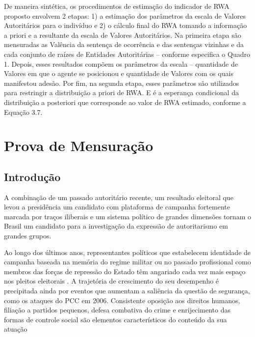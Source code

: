 \documentclass[
12pt,				%
openright,			%
twoside,			%
a4paper,			%
english,			%
french,				%
spanish,			%
brazil				%
]{abntex2}
\begin{document}
De maneira sintética, os procedimentos de estimação do indicador de RWA proposto envolvem 2 etapas: 1) a estimação dos parâmetros da escala de Valores Autoritários para o indivíduo e 2) o cálculo final do RWA tomando a informação a priori e a resultante da escala de Valores Autoritários. Na primeira etapa são mensuradas as Valência da sentença de ocorrência e das sentenças vizinhas e da cada conjunto de raízes de Entidades Autoritárias -- conforme especifica o Quadro 1. Depois, esses resultados compõem os parâmetros da escala -- quantidade de Valores em que o agente se posicionou e quantidade de Valores com os quais manifestou adesão. Por fim, na segunda etapa, esses parâmetros são utilizados para restringir a distribuição a priori de RWA. E é a esperança condicional da distribuição a posteriori que corresponde ao valor de RWA estimado, conforme a Equação 3.7.

\chapter{Prova de Mensuração}\label{resultados}

\section{Introdução}

A combinação de um passado autoritário recente, um resultado eleitoral que levou a presidência um candidato com plataforma de campanha fortemente marcada por traços iliberais \cite{hunter2019bolsonaro} e um sistema político de grandes dimensões tornam o Brasil um candidato para a investigação da expressão de autoritarismo em grandes grupos.

Ao longo dos últimos anos, representantes políticos que estabelecem identidade de campanha baseada na memória do regime militar ou no passado profissional como membros das forças de repressão do Estado têm angariado cada vez mais espaço nos pleitos eleitorais \cite{berlatto2015candidatos, berlatto2016policia}. A trajetória de crescimento do seu desempenho é precipitada ainda por eventos que aumentam a saliência da questão de segurança, como os ataques do PCC em 2006. Consistente oposição aos direitos humanos, filiação a partidos pequenos, defesa combativa do crime e enrijecimento das formas de controle social são elementos característicos do conteúdo da sua atuação \cite{berlatto2015candidatos, berlatto2016policia, faganellobancada, faganello2017voto}
\end{document}
